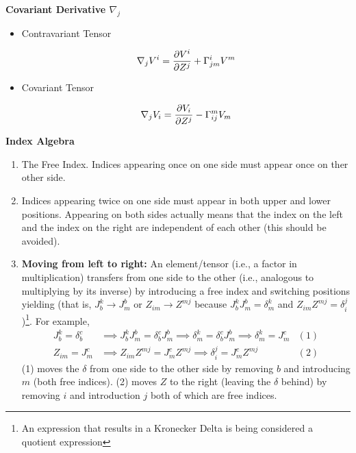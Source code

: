 \documentclass[12pt,a4paper]{report}
\newcommand{\COFF}[3]{\Gamma^{#1}_{{#2}{#3}}}
\begin{document}
\begin{description}
	\item \textbf{Covariant Derivative $\nabla_j$}
	\begin{itemize}
		\item Contravariant Tensor
		
		\begin{align*}
			\nabla_j V^i = \PART{V^i}{Z^j}+\COFF{i}{j}{m}V^m
		\end{align*}
		
		\item Covariant Tensor
		
		\begin{align*}
			\nabla_j V_i = \PART{V_i}{Z^j}-\COFF{m}{i}{j}V_m
		\end{align*}

	\end{itemize}
	
	\item \textbf{Index Algebra}
	\begin{enumerate}
		\item The Free Index.  Indices appearing once on one side must appear once on ther other side.
		\item Indices appearing twice on one side must appear in both upper and lower positions.  Appearing on both sides actually means that the index on the left and the index on the right are independent of each other (this should be avoided).
		\item \textbf{Moving from left to right: }An element/tensor (i.e., a factor in multiplication) transfers from one side to the other (i.e., analogous to multiplying by its inverse) by introducing a free index and switching positions yielding (that is, $J_b^k \to J^b_m$ or $Z_{im} \to Z^{mj}$ because $J_b^kJ^b_m = \delta^k_m$ and $Z_{im}Z^{mj} = \delta_i^j$)\footnote{An expression that results in a Kronecker Delta is being considered a quotient expression}. For example,
		\begin{align*}
			J_b^k = \delta_b^c &\implies J_b^k J^b_m = \delta_b^c J^b_m \implies \delta_m^k= \delta_b^c J^b_m \implies \delta_m^k = J_m^c & (1)\\
			Z_{im} = J^c_m &\implies Z_{im}Z^{mj} = J^c_mZ^{mj} \implies \delta_i^j = J^c_mZ^{mj} & (2)
		\end{align*}(1) moves the $\delta$ from one side to the other side by removing $b$ and introducing $m$ (both free indices).  (2) moves $Z$ to the right (leaving the $\delta$ behind) by removing $i$ and introduction $j$ both of which are free indices.
	\end{enumerate}
	

\end{description}
\end{document}
